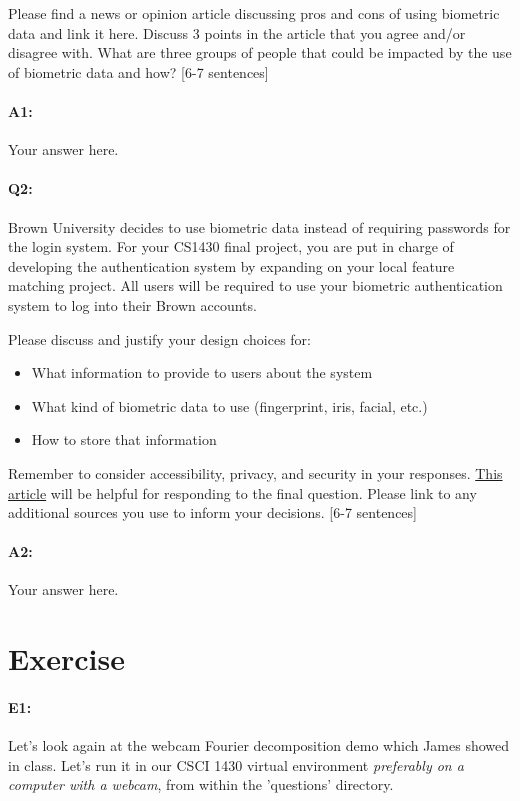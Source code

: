 Please find a news or opinion article discussing pros and cons of using biometric data and link it here. Discuss 3 points in the article that you agree and/or disagree with. What are three groups of people that could be impacted by the use of biometric data and how? [6-7 sentences]

\paragraph{A1:} Your answer here.
\pagebreak

\paragraph{Q2:} Brown University decides to use biometric data instead of requiring passwords for the login system. For your CS1430 final project, you are put in charge of developing the authentication system by expanding on your local feature matching project. All users will be required to use your biometric authentication system to log into their Brown accounts. 

Please discuss and justify your design choices for: 
\begin{itemize}
	\item What information to provide to users about the system
	\item What kind of biometric data to use (fingerprint, iris, facial, etc.)
	\item How to store that information 
\end{itemize}
Remember to consider accessibility, privacy, and security in your responses. \href{https://ievoreader.com/how-biometric-data-is-stored/}{This article} will be helpful for responding to the final question. Please link to any additional sources you use to inform your decisions.
[6-7 sentences]

\paragraph{A2:} Your answer here.
\pagebreak

\section*{Exercise}

\paragraph{E1:} Let's look again at the webcam Fourier decomposition demo which James showed in class. Let's run it in our CSCI 1430 virtual environment \emph{preferably on a computer with a webcam}, from within the 'questions' directory.

